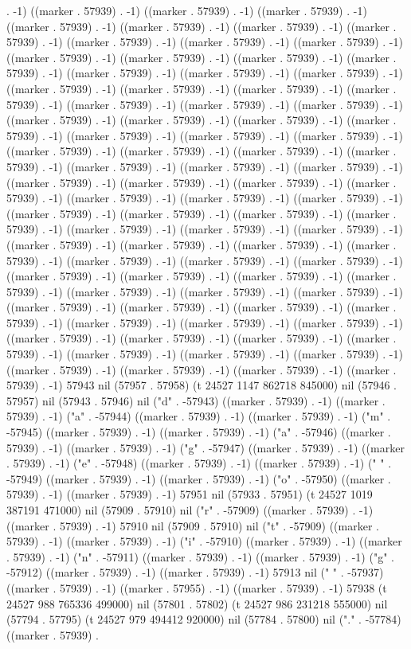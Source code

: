. -1) ((marker . 57939) . -1) ((marker . 57939) . -1) ((marker . 57939) . -1) ((marker . 57939) . -1) ((marker . 57939) . -1) ((marker . 57939) . -1) ((marker . 57939) . -1) ((marker . 57939) . -1) ((marker . 57939) . -1) ((marker . 57939) . -1) ((marker . 57939) . -1) ((marker . 57939) . -1) ((marker . 57939) . -1) ((marker . 57939) . -1) ((marker . 57939) . -1) ((marker . 57939) . -1) ((marker . 57939) . -1) ((marker . 57939) . -1) ((marker . 57939) . -1) ((marker . 57939) . -1) ((marker . 57939) . -1) ((marker . 57939) . -1) ((marker . 57939) . -1) ((marker . 57939) . -1) ((marker . 57939) . -1) ((marker . 57939) . -1) ((marker . 57939) . -1) ((marker . 57939) . -1) ((marker . 57939) . -1) ((marker . 57939) . -1) ((marker . 57939) . -1) ((marker . 57939) . -1) ((marker . 57939) . -1) ((marker . 57939) . -1) ((marker . 57939) . -1) ((marker . 57939) . -1) ((marker . 57939) . -1) ((marker . 57939) . -1) ((marker . 57939) . -1) ((marker . 57939) . -1) ((marker . 57939) . -1) ((marker . 57939) . -1) ((marker . 57939) . -1) ((marker . 57939) . -1) ((marker . 57939) . -1) ((marker . 57939) . -1) ((marker . 57939) . -1) ((marker . 57939) . -1) ((marker . 57939) . -1) ((marker . 57939) . -1) ((marker . 57939) . -1) ((marker . 57939) . -1) ((marker . 57939) . -1) ((marker . 57939) . -1) ((marker . 57939) . -1) ((marker . 57939) . -1) ((marker . 57939) . -1) ((marker . 57939) . -1) ((marker . 57939) . -1) ((marker . 57939) . -1) ((marker . 57939) . -1) ((marker . 57939) . -1) ((marker . 57939) . -1) ((marker . 57939) . -1) ((marker . 57939) . -1) ((marker . 57939) . -1) ((marker . 57939) . -1) ((marker . 57939) . -1) ((marker . 57939) . -1) ((marker . 57939) . -1) ((marker . 57939) . -1) ((marker . 57939) . -1) ((marker . 57939) . -1) ((marker . 57939) . -1) ((marker . 57939) . -1) ((marker . 57939) . -1) ((marker . 57939) . -1) ((marker . 57939) . -1) ((marker . 57939) . -1) ((marker . 57939) . -1) ((marker . 57939) . -1) ((marker . 57939) . -1) ((marker . 57939) . -1) ((marker . 57939) . -1) 57943 nil (57957 . 57958) (t 24527 1147 862718 845000) nil (57946 . 57957) nil (57943 . 57946) nil ("d" . -57943) ((marker . 57939) . -1) ((marker . 57939) . -1) ("a" . -57944) ((marker . 57939) . -1) ((marker . 57939) . -1) ("m" . -57945) ((marker . 57939) . -1) ((marker . 57939) . -1) ("a" . -57946) ((marker . 57939) . -1) ((marker . 57939) . -1) ("g" . -57947) ((marker . 57939) . -1) ((marker . 57939) . -1) ("e" . -57948) ((marker . 57939) . -1) ((marker . 57939) . -1) (" " . -57949) ((marker . 57939) . -1) ((marker . 57939) . -1) ("o" . -57950) ((marker . 57939) . -1) ((marker . 57939) . -1) 57951 nil (57933 . 57951) (t 24527 1019 387191 471000) nil (57909 . 57910) nil ("r" . -57909) ((marker . 57939) . -1) ((marker . 57939) . -1) 57910 nil (57909 . 57910) nil ("t" . -57909) ((marker . 57939) . -1) ((marker . 57939) . -1) ("i" . -57910) ((marker . 57939) . -1) ((marker . 57939) . -1) ("n" . -57911) ((marker . 57939) . -1) ((marker . 57939) . -1) ("g" . -57912) ((marker . 57939) . -1) ((marker . 57939) . -1) 57913 nil (" " . -57937) ((marker . 57939) . -1) ((marker . 57955) . -1) ((marker . 57939) . -1) 57938 (t 24527 988 765336 499000) nil (57801 . 57802) (t 24527 986 231218 555000) nil (57794 . 57795) (t 24527 979 494412 920000) nil (57784 . 57800) nil ("." . -57784) ((marker . 57939) . 